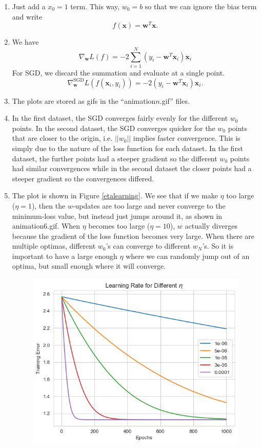 \documentclass[12pt]{article}
\newcommand{\x}{\mathbf x}
\newcommand{\w}{\mathbf w}
\begin{document}
\begin{enumerate}[leftmargin=*]
\begin{enumerate}[label = \Alph*.]
\item Just add a $x_0 = 1$ term. This way, $w_0 = b$ so that we can ignore the bias term and write
\[ f(\x) = \w^T \x. \]
\item We have
\[ \nabla_\w L(f) = - 2 \sum_{i = 1}^N (y_i - \w^T \x_i) \x_i \]
For SGD, we discard the summation and evaluate at a single point.
\[ \nabla_\w^{\text{SGD}} L(f(\x_i, y_i)) = -2 (y_i - \w^T \x_i) \x_i. \]
\item The plots are stored as gifs in the ``animation$n$.gif'' files.
\item In the first dataset, the SGD converges fairly evenly for the different $w_0$ points. In the second dataset, the SGD converges quicker for the $w_0$ points that are closer to the origin, i.e. $||w_0||$ implies faster convergence. This is simply due to the nature of the loss function for each dataset. In the first dataset, the further points had a steeper gradient so the different $w_0$ points had similar convergences while in the second dataset the closer points had a steeper gradient so the convergences differed.
\item The plot is shown in Figure \ref{etalearning}. We see that if we make $\eta$ too large ($\eta = 1$), then the $w$-updates are too large and never converge to the minimum-loss value, but instead just jumps around it, as shown in animation6.gif. When $\eta$ becomes too large ($\eta = 10$), $w$ actually diverges because the gradient of the loss function becomes very large. When there are multiple optimas, different $w_0$'s can converge to different $w_N$'s. So it is important to have a large enough $\eta$ where we can randomly jump out of an optima, but small enough where it will converge.
\begin{figure}[h!]
\centering
\includegraphics[scale=0.75]{epochlearning.png}

\end{figure}
\end{enumerate}
\end{enumerate}
\end{document}
